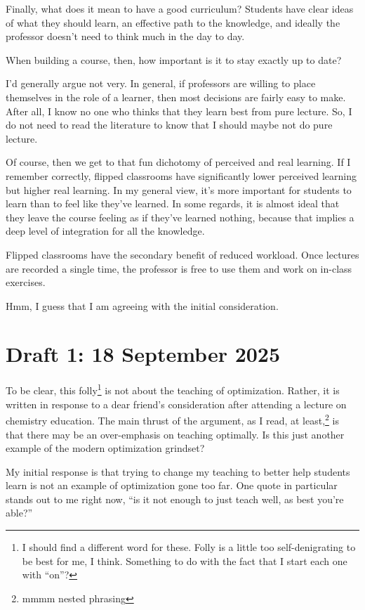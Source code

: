 \documentclass[12pt]{article}
\newcommand{\say}[1]{``#1''}
\renewcommand{\,}{\textsuperscript{,}}
\begin{document}
Finally, what does it mean to have a good curriculum?
Students have clear ideas of what they should learn, an effective path to the knowledge, and ideally the professor doesn't need to think much in the day to day.

When building a course, then, how important is it to stay exactly up to date?

I'd generally argue not very.
In general, if professors are willing to place themselves in the role of a learner, then most decisions are fairly easy to make.
After all, I know no one who thinks that they learn best from pure lecture.
So, I do not need to read the literature to know that I should maybe not do pure lecture.

Of course, then we get to that fun dichotomy of perceived and real learning.
If I remember correctly, flipped classrooms have significantly lower perceived learning but higher real learning.
In my general view, it's more important for students to learn than to feel like they've learned.
In some regards, it is almost ideal that they leave the course feeling as if they've learned nothing, because that implies a deep level of integration for all the knowledge.

Flipped classrooms have the secondary benefit of reduced workload.
Once lectures are recorded a single time, the professor is free to use them and work on in-class exercises.

Hmm, I guess that I am agreeing with the initial consideration.

\section{Draft 1: 18 September 2025}

To be clear, this folly\footnote{I should find a different word for these. Folly is a little too self-denigrating to be best for me, I think. Something to do with the fact that I start each one with \say{on}?} is not about the teaching of optimization.
Rather, it is written in response to a dear friend's consideration after attending a lecture on chemistry education.
The main thrust of the argument, as I read, at least,\footnote{mmmm nested phrasing} is that there may be an over-emphasis on teaching optimally.
Is this just another example of the modern optimization grindset?

My initial response is that trying to change my teaching to better help students learn is not an example of optimization gone too far.
One quote in particular stands out to me right now, \say{is it not enough to just teach well, as best you're able?}
\end{document}
